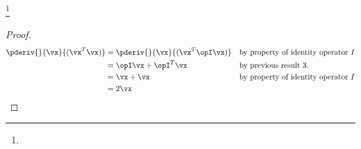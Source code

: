 \begin{corollary}
\footnote{
  }
\label{cor:mc_xAx}
\end{corollary}
\begin{proof}
\begin{align*}
  \pderiv{}{\vx}{(\vx ^T\vx )}
    &= \pderiv{}{\vx}{(\vx ^T \opI \vx )}
    && \text{by property of identity operator $I$}
  \\&= \opI\vx  + \opI^T\vx
    && \text{by previous result 3.}
  \\&= \vx  + \vx
    && \text{by property of identity operator $I$}
  \\&= 2\vx
\end{align*}
\end{proof}



